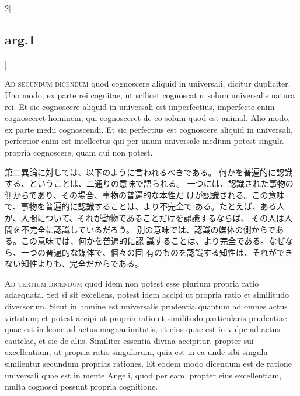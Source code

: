 \documentclass[paper=a4paper,fontsize=10pt,jafontsize=9pt,titlepage]{jlreq}
\begin{document}
\begin{paracol}{2}[\subsection{arg.1}]
\switchcolumn*[\subsection{ad.2}]

{\scshape Ad secundum dicendum} quod cognoscere aliquid
in universali, dicitur dupliciter. Uno modo, ex parte rei cognitae, ut
scilicet cognoscatur solum universalis natura rei. Et sic cognoscere
aliquid in universali est imperfectius, imperfecte enim cognosceret
hominem, qui cognosceret de eo solum quod est animal. Alio modo, ex
parte medii cognoscendi. Et sic perfectius est cognoscere aliquid in
universali, perfectior enim est intellectus qui per unum universale
medium potest singula propria cognoscere, quam qui non potest.

\switchcolumn

第二異論に対しては、以下のように言われるべきである。
 何かを普遍的に認識する、ということは、二通りの意味で語られる。
 一つには、認識された事物の側からであり、その場合、事物の普遍的な本性だ
 けが認識される。この意味で、事物を普遍的に認識することは、より不完全で
 ある。たとえば、ある人が、人間について、それが動物であることだけを認識するならば、
 その人は人間を不完全に認識しているだろう。
 別の意味では、認識の媒体の側からである。この意味では、何かを普遍的に認
 識することは、より完全である。なぜなら、一つの普遍的な媒体で、個々の固
 有のものを認識する知性は、それができない知性よりも、完全だからである。

\switchcolumn*[\subsection{ad.3}]

{\scshape Ad tertium dicendum} quod idem non potest esse
plurium propria ratio adaequata. Sed si sit excellens, potest idem
accipi ut propria ratio et similitudo diversorum. Sicut in homine est
universalis prudentia quantum ad omnes actus virtutum; et potest accipi
ut propria ratio et similitudo particularis prudentiae quae est in leone
ad actus magnanimitatis, et eius quae est in vulpe ad actus cautelae, et
sic de aliis. Similiter essentia divina accipitur, propter sui
excellentiam, ut propria ratio singulorum, quia est in ea unde sibi
singula similentur secundum proprias rationes. Et eodem modo dicendum
est de ratione universali quae est in mente Angeli, quod per eam,
propter eius excellentiam, multa cognosci possunt propria cognitione.

\switchcolumn


\end{paracol}
\end{document}
